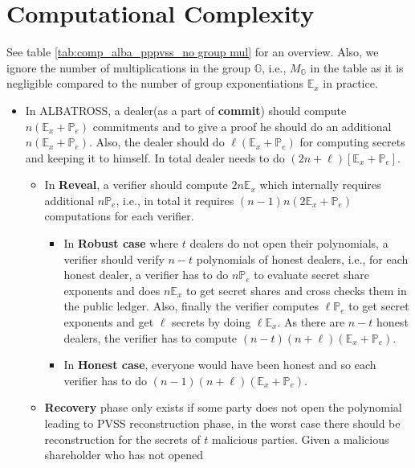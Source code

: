 \section{Computational Complexity}

See table \ref{tab:comp_alba_pppvss_no group mul} for an overview. Also, we ignore the number of 
multiplications in the group $\mathbb{G}$, i.e., $M_{\mathbb{G}}$ in the table as it is negligible compared to 
the number of group exponentiations $\mathbb{E}_x$ in practice. 
\begin{itemize}
    \item In ALBATROSS, a dealer(as a part of \textbf{commit}) should compute $n(\mathbb{E}_x+\mathbb{P}_e)$ commitments and to give a proof he should do an additional $n(\mathbb{E}_{x}+\mathbb{P}_e)$. Also, the dealer should do $\ell(\mathbb{E}_x+\mathbb{P}_e)$ for computing secrets and keeping it to himself. In total dealer needs to do $(2n+\ell)[\mathbb{E}_x+\mathbb{P}_e]$.
        \begin{itemize}
            \item In \textbf{Reveal}, a verifier should compute $2n\mathbb{E}_{x}$ which internally requires additional $n\mathbb{P}_e$, i.e., in total it requires $(n-1)n(2\mathbb{E}_{x}+\mathbb{P}_{e})$ computations for each verifier.
            \begin{itemize}
                \item In \textbf{Robust case} where $t$ dealers do not open their polynomials, a verifier should verify $n-t$ polynomials of honest dealers, i.e., for each honest dealer, a verifier has to do $n\mathbb{P}_e$ to evaluate secret share exponents and does $n\mathbb{E}_x$ to get secret shares and cross checks them in the public ledger. Also, finally the verifier computes $\ell\mathbb{P}_e$ to get secret exponents and get $\ell$ secrets by doing $\ell\mathbb{E}_x$. As there are $n-t$ honest dealers, the verifier has to compute $(n-t)(n+\ell)(\mathbb{E}_x+\mathbb{P}_e)$.
                \item  In \textbf{Honest case}, everyone would have been honest and so each verifier has to do $(n-1)(n+\ell)(\mathbb{E}_x+\mathbb{P}_e)$.
            \end{itemize}
            \item \textbf{Recovery} phase only exists if some party does not 
            open the polynomial leading to PVSS reconstruction phase, in the 
            worst case there should be reconstruction for the secrets of $t$ 
            malicious parties. Given a malicious shareholder who has not opened 

\end{itemize}
\end{itemize}
